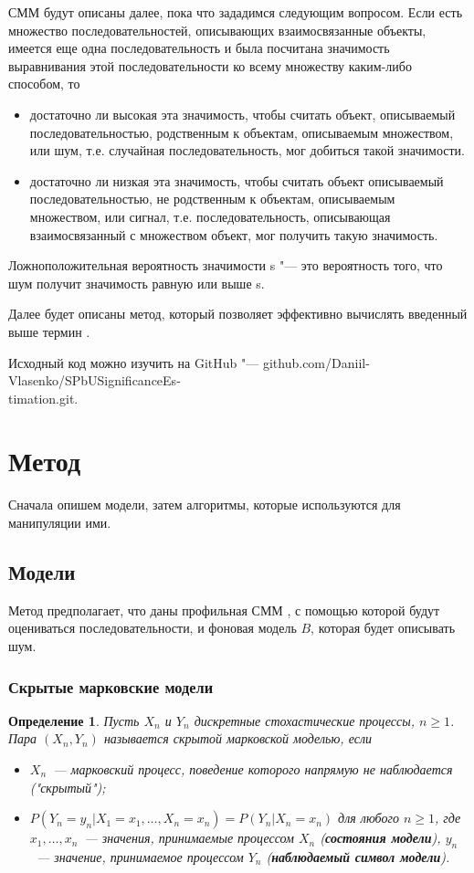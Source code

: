\documentclass[]{article}
\newtheorem{defenition}{Определение}
\begin{document}
		СММ будут описаны далее, пока что зададимся следующим вопросом. Если есть множество последовательностей, описывающих взаимосвязанные объекты, имеется еще одна последовательность и была посчитана значимость выравнивания этой последовательности ко всему множеству каким-либо способом, то
		\begin{itemize}
			\item достаточно ли высокая эта значимость, чтобы считать объект, описываемый последовательностью, родственным к объектам, описываемым множеством, или шум, т.е. случайная последовательность, мог добиться такой значимости.
			\item достаточно ли низкая эта значимость, чтобы считать объект описываемый последовательностью, не родственным к объектам, описываемым множеством, или сигнал, т.е. последовательность, описывающая взаимосвязанный с множеством объект, мог получить такую значимость. 
		\end{itemize}
		Ложноположительная вероятность значимости s "--- это вероятность того, что шум получит значимость равную или выше s. 
		
		Далее будет описаны метод, который позволяет эффективно вычислять введенный выше термин \cite{Newberg09}.
		
		Исходный код можно изучить на GitHub "--- github.com/Daniil-Vlasenko/SPbUSignificanceEs-\\timation.git.
		
		\section{Метод}
		Сначала опишем модели, затем алгоритмы, которые используются для манипуляции ими.
		\subsection{Модели}
		Метод предполагает, что даны профильная СММ \cite{Compeau15_2}, с помощью которой будут оцениваться последовательности, и фоновая модель $B$, которая будет описывать шум.
		\subsubsection{Скрытые марковские модели}						
			\begin{defenition}
				Пусть $X_{n}$ и $Y_{n}$ дискретные стохастические процессы, $n \geq 1$. Пара $(X_{n}, Y_{n})$ называется скрытой марковской моделью, если
				\begin{itemize}
					\item $X_{n}$~--- марковский процесс, поведение которого напрямую не наблюдается ("скрытый");
					\item $P(Y_{n} = y_{n}|X_{1} = x_{1},\dots, X_{n} = x_{n}) = P(Y_{n}|X_{n}=x_{n})$ для любого $n \geq 1$, где $x_{1},\dots,x_{n}$~--- значения, принимаемые процессом  $X_{n}$ (\textbf{состояния модели}), $ y_{n}$~--- значение, принимаемое процессом $Y_{n}$ (\textbf{наблюдаемый символ модели}).
				\end{itemize}
			\end{defenition}
		
\end{document}

